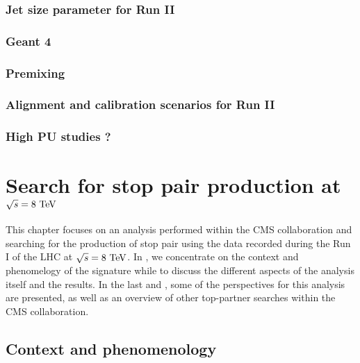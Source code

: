         \subsection{Jet size parameter for Run II}

        \subsection{Geant 4}

        \subsection{Premixing}

        \subsection{Alignment and calibration scenarios for Run II}

        \subsection{High PU studies ?}



\setcounter{mtc}{4}
\chapter{Search for stop pair production at $\sqrt{s} = 8~\text{TeV}$}
\minitoc
\newpage

    This chapter focuses on an analysis performed within the CMS collaboration
    and searching for the production of stop pair using the data recorded during
    the Run I of the LHC at $\sqrt{s} = 8~\text{TeV}$. In ,
    we concentrate on the context and phenomelogy of the signature while
     to  discuss
    the different aspects of the analysis itself and the results. In the last
     and , some
    of the perspectives for this analysis are presented, as well as an overview of
    other top-partner searches within the CMS collaboration.

    \section{Context and phenomenology \label{sec:analysis_contextAndPheno}}

